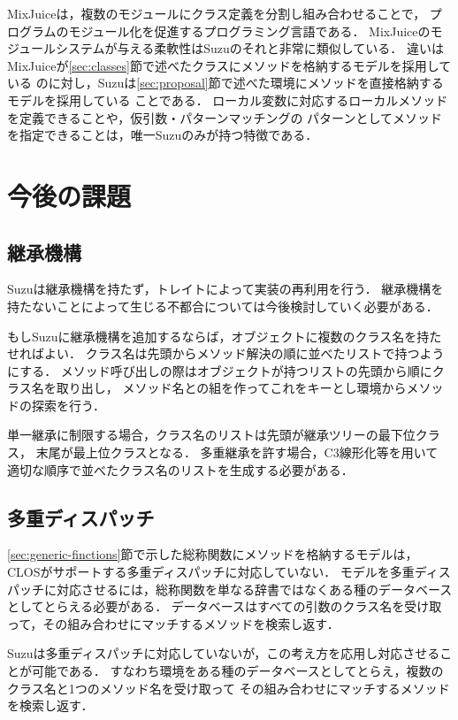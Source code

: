 \documentclass{ipsjprosym}
\begin{document}
MixJuice\cite{Ichisugi:2002}は，複数のモジュールにクラス定義を分割し組み合わせることで，
プログラムのモジュール化を促進するプログラミング言語である．
MixJuiceのモジュールシステムが与える柔軟性はSuzuのそれと非常に類似している．
違いはMixJuiceが\ref{sec:classes}節で述べたクラスにメソッドを格納するモデルを採用している
のに対し，Suzuは\ref{sec:proposal}節で述べた環境にメソッドを直接格納するモデルを採用している
ことである．
ローカル変数に対応するローカルメソッドを定義できることや，仮引数・パターンマッチングの
パターンとしてメソッドを指定できることは，唯一Suzuのみが持つ特徴である．

\section{今後の課題}

\subsection{継承機構}

Suzuは継承機構を持たず，トレイトによって実装の再利用を行う．
継承機構を持たないことによって生じる不都合については今後検討していく必要がある．

もしSuzuに継承機構を追加するならば，オブジェクトに複数のクラス名を持たせればよい．
クラス名は先頭からメソッド解決の順に並べたリストで持つようにする．
メソッド呼び出しの際はオブジェクトが持つリストの先頭から順にクラス名を取り出し，
メソッド名との組を作ってこれをキーとし環境からメソッドの探索を行う．

単一継承に制限する場合，クラス名のリストは先頭が継承ツリーの最下位クラス，
末尾が最上位クラスとなる．
多重継承を許す場合，C3線形化\cite{Barrett:1996:MSL:236337.236343}等を用いて
適切な順序で並べたクラス名のリストを生成する必要がある．

\subsection{多重ディスパッチ}
\label{sec:multiple-dispatch}

\ref{sec:generic-finctions}節で示した総称関数にメソッドを格納するモデルは，
CLOSがサポートする多重ディスパッチに対応していない．
モデルを多重ディスパッチに対応させるには，総称関数を単なる辞書ではなくある種のデータベース
としてとらえる必要がある．
データベースはすべての引数のクラス名を受け取って，その組み合わせにマッチするメソッドを検索し返す．

Suzuは多重ディスパッチに対応していないが，この考え方を応用し対応させることが可能である．
すなわち環境をある種のデータベースとしてとらえ，複数のクラス名と1つのメソッド名を受け取って
その組み合わせにマッチするメソッドを検索し返す．
\end{document}
